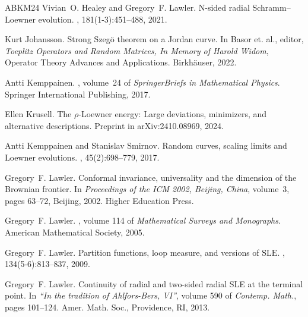 \documentclass[a4paper, 11pt]{article}
\theoremstyle{definition}
\numberwithin{equation}{section}
\numberwithin{figure}{section}
\begin{document}
\begin{thebibliography}{ABKM24}
Vivian~O. Healey and Gregory~F. Lawler.
\newblock N-sided radial {S}chramm–{L}oewner evolution.
, 181(1-3):451--488, 2021.

Kurt Johansson.
\newblock Strong {S}zeg{\"o} theorem on a {J}ordan curve.
\newblock In Basor et. al., editor, {\em Toeplitz Operators and Random
  Matrices, In Memory of Harold Widom}, Operator Theory Advances and
  Applications. Birkh\"auser, 2022.

Antti Kemppainen.
, volume~24 of {\em SpringerBriefs
  in Mathematical Physics}.
\newblock Springer International Publishing, 2017.

Ellen Krusell.
\newblock The {$\rho$}-{L}oewner energy: {L}arge deviations, minimizers, and
  alternative descriptions.
\newblock Preprint in arXiv:2410.08969, 2024.

Antti Kemppainen and Stanislav Smirnov.
\newblock Random curves, scaling limits and {L}oewner evolutions.
, 45(2):698--779, 2017.

Gregory~F. Lawler.
\newblock Conformal invariance, universality and the dimension of the
  {B}rownian frontier.
\newblock In {\em Proceedings of the ICM 2002, Beijing, China}, volume~3, pages
  63--72, Beijing, 2002. Higher Education Press.

Gregory~F. Lawler.
, volume 114 of
  {\em Mathematical Surveys and Monographs}.
\newblock American Mathematical Society, 2005.

Gregory~F. Lawler.
\newblock Partition functions, loop measure, and versions of {$\mathrm{SLE}$}.
, 134(5-6):813--837, 2009.

Gregory~F. Lawler.
\newblock Continuity of radial and two-sided radial {SLE} at the terminal
  point.
\newblock In {\em ``In the tradition of Ahlfors-Bers, VI''}, volume 590 of {\em
  Contemp. Math.}, pages 101--124. Amer. Math. Soc., Providence, RI, 2013.


\end{thebibliography}
\end{document}
